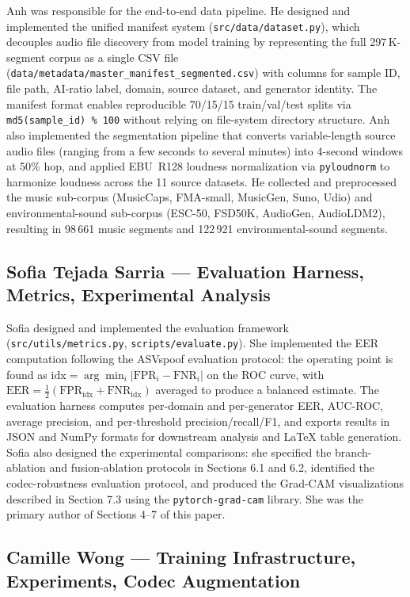 \documentclass[10pt,twocolumn,a4paper]{article}
\begin{document}
Anh was responsible for the end-to-end data pipeline. He designed and implemented the unified manifest system (\texttt{src/data/dataset.py}), which decouples audio file discovery from model training by representing the full 297\,K-segment corpus as a single CSV file (\texttt{data/metadata/master\_manifest\_segmented.csv}) with columns for sample ID, file path, AI-ratio label, domain, source dataset, and generator identity. The manifest format enables reproducible 70/15/15 train/val/test splits via \texttt{md5(sample\_id) \% 100} without relying on file-system directory structure. Anh also implemented the segmentation pipeline that converts variable-length source audio files (ranging from a few seconds to several minutes) into 4-second windows at 50\% hop, and applied EBU~R128 loudness normalization via \texttt{pyloudnorm} to harmonize loudness across the 11 source datasets. He collected and preprocessed the music sub-corpus (MusicCaps, FMA-small, MusicGen, Suno, Udio) and environmental-sound sub-corpus (ESC-50, FSD50K, AudioGen, AudioLDM2), resulting in 98\,661 music segments and 122\,921 environmental-sound segments.

\subsection*{Sofia Tejada Sarria --- Evaluation Harness, Metrics, Experimental Analysis}

Sofia designed and implemented the evaluation framework (\texttt{src/utils/metrics.py}, \texttt{scripts/evaluate.py}). She implemented the EER computation following the ASVspoof evaluation protocol: the operating point is found as $\text{idx} = \arg\min_i |\text{FPR}_i - \text{FNR}_i|$ on the ROC curve, with $\text{EER} = \tfrac{1}{2}(\text{FPR}_{\text{idx}} + \text{FNR}_{\text{idx}})$ averaged to produce a balanced estimate. The evaluation harness computes per-domain and per-generator EER, AUC-ROC, average precision, and per-threshold precision/recall/F1, and exports results in JSON and NumPy formats for downstream analysis and LaTeX table generation. Sofia also designed the experimental comparisons: she specified the branch-ablation and fusion-ablation protocols in Sections 6.1 and 6.2, identified the codec-robustness evaluation protocol, and produced the Grad-CAM visualizations described in Section 7.3 using the \texttt{pytorch-grad-cam} library. She was the primary author of Sections 4--7 of this paper.

\subsection*{Camille Wong --- Training Infrastructure, Experiments, Codec Augmentation}
\end{document}
